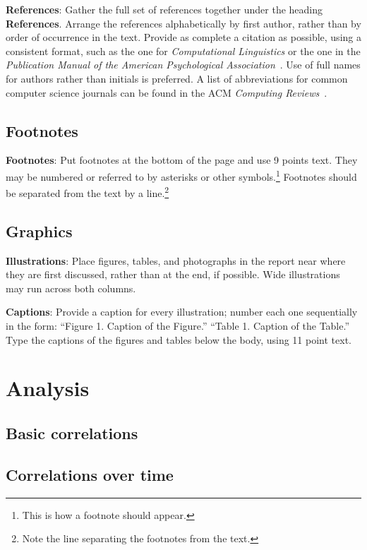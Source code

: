 \documentclass[11pt]{article}
\begin{document}
\textbf{References}: Gather the full set of references together under
the heading {\bf References}. Arrange the references alphabetically
by first author, rather than by order of occurrence in the text.
Provide as complete a citation as possible, using a consistent format,
such as the one for {\em Computational Linguistics\/} or the one in the 
{\em Publication Manual of the American 
Psychological Association\/}~\cite{APA:83}.  Use of full names for
authors rather than initials is preferred.  A list of abbreviations
for common computer science journals can be found in the ACM 
{\em Computing Reviews\/}~\cite{ACM:83}.

\subsection{Footnotes}

{\bf Footnotes}: Put footnotes at the bottom of the page and use 9
points text. They may be numbered or referred to by asterisks or other
symbols.\footnote{This is how a footnote should appear.} Footnotes
should be separated from the text by a line.\footnote{Note the line
separating the footnotes from the text.}

\subsection{Graphics}

{\bf Illustrations}: Place figures, tables, and photographs in the
report near where they are first discussed, rather than at the end, if
possible.  Wide illustrations may run across both columns.

{\bf Captions}: Provide a caption for every illustration; number each one
sequentially in the form:  ``Figure 1. Caption of the Figure.'' ``Table 1.
Caption of the Table.''  Type the captions of the figures and 
tables below the body, using 11 point text.

\section{Analysis}

\subsection{Basic correlations}

\subsection{Correlations over time}
\end{document}
